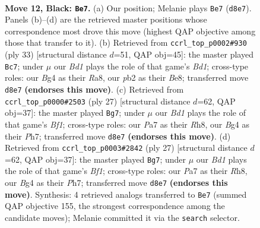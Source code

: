 \documentclass[11pt]{article}
\begin{document}
\clearpage

\begin{figure}[p]\centering
\begin{subfigure}{0.46\textwidth}\centering
\resizebox{\linewidth}{!}{%
\newchessgame
\chessboard[
  setfen={rn1b1rk1/ppp2pp1/7p/4P3/2p3bP/2N1P3/PP1N1P2/R3KB1R b KQ - 1 12},
  showmover=false,
  pgfstyle=straightmove, color=movearrow, markmove={d8-e7}
]}
\caption{}
\end{subfigure}\hfill
\begin{subfigure}{0.46\textwidth}\centering
\resizebox{\linewidth}{!}{%
\newchessgame
\chessboard[
  setfen={r2bbrk1/5pp1/p3p3/1p5p/4PP1P/P1N5/1PP3P1/1K1R1B1R b - - 0 17},
  showmover=false,
  pgfstyle=straightmove, color=movearrow, markmove={d8-c7}
]}
\caption{}
\end{subfigure}
\\[4pt]
\begin{subfigure}{0.46\textwidth}\centering
\resizebox{\linewidth}{!}{%
\newchessgame
\chessboard[
  setfen={2kr1b1r/pp3p1p/4bpp1/8/NPp5/P7/4BPPP/R3K1NR b KQ - 1 14},
  showmover=false,
  pgfstyle=straightmove, color=movearrow, markmove={f8-g7}
]}
\caption{}
\end{subfigure}\hfill
\begin{subfigure}{0.46\textwidth}\centering
\resizebox{\linewidth}{!}{%
\newchessgame
\chessboard[
  setfen={2kr1b1r/pp3p1p/4bpp1/8/NPp5/P7/4BPPP/R3K1NR b KQ - 1 14},
  showmover=false,
  pgfstyle=straightmove, color=movearrow, markmove={f8-g7}
]}
\caption{}
\end{subfigure}
\caption{\textbf{Move 12, Black: \texttt{Be7}.} (a) Our position; Melanie plays \texttt{Be7} (\texttt{d8e7}). Panels (b)--(d) are the retrieved master positions whose correspondence most drove this move (highest QAP objective among those that transfer to it). (b) Retrieved from \texttt{ccrl\_top\_p0002\#930} (ply 33) [structural distance $d$=51, QAP obj=45]: the master played \texttt{Bc7}; under $\mu$ our \emph{Bd1} plays the role of that game's \emph{Bd1}; cross-type roles: our \emph{B}g4 as their \emph{R}a8, our \emph{p}b2 as their \emph{B}e8; transferred move \texttt{d8e7} \textbf{(endorses this move)}. (c) Retrieved from \texttt{ccrl\_top\_p0000\#2503} (ply 27) [structural distance $d$=62, QAP obj=37]: the master played \texttt{Bg7}; under $\mu$ our \emph{Bd1} plays the role of that game's \emph{Bf1}; cross-type roles: our \emph{P}a7 as their \emph{R}h8, our \emph{B}g4 as their \emph{P}h7; transferred move \texttt{d8e7} \textbf{(endorses this move)}. (d) Retrieved from \texttt{ccrl\_top\_p0003\#2842} (ply 27) [structural distance $d$=62, QAP obj=37]: the master played \texttt{Bg7}; under $\mu$ our \emph{Bd1} plays the role of that game's \emph{Bf1}; cross-type roles: our \emph{P}a7 as their \emph{R}h8, our \emph{B}g4 as their \emph{P}h7; transferred move \texttt{d8e7} \textbf{(endorses this move)}. Synthesis: 4 retrieved analogs transferred to \texttt{Be7} (summed QAP objective 155, the strongest correspondence among the candidate moves); Melanie committed it via the \texttt{search} selector.}
\label{fig:thought-m23}
\end{figure}
\end{document}
